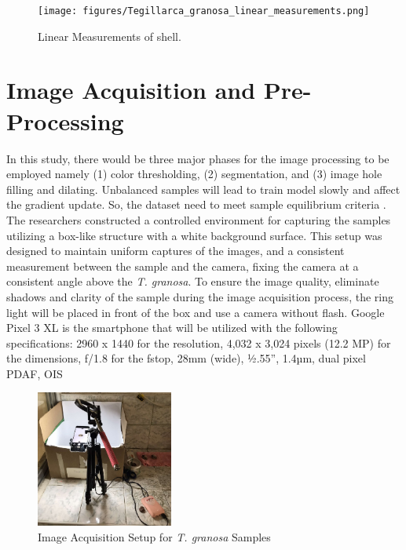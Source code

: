 \begin{figure}[!htbp]
	\centering
	\texttt{[image: figures/Tegillarca\_granosa\_linear\_measurements.png]}
	\caption{Linear Measurements of  \Tegillarcagranosa shell.}
	\label{fig:linear_measurements}
\end{figure}

\section{Image Acquisition and Pre-Processing}
\label{sec:imageprocess}
In this study, there would be three major phases for the image processing to be employed namely (1) color thresholding, (2) segmentation, and (3) image hole filling and dilating. Unbalanced samples will lead to train model slowly and affect the gradient update. So, the dataset need to meet sample equilibrium criteria \cite{cui2020}. The researchers constructed a controlled environment for capturing the samples utilizing a box-like structure with a white background surface. This setup was designed to maintain uniform captures of the images, and a consistent measurement between the sample and the camera, fixing the camera at a consistent angle above the \textit{T. granosa}. To ensure the image quality, eliminate shadows and clarity of the sample during the image acquisition process, the ring light will be placed in front of the box and use a camera without flash. Google Pixel 3 XL is the smartphone that will be utilized with the following specifications: 2960 x 1440 for the resolution, 4,032 x 3,024 pixels (12.2 MP) for the dimensions, f/1.8 for the fstop, 28mm (wide), ½.55”, 1.4µm, dual pixel PDAF, OIS \cite{concepcion2023}

\begin{figure}[!htbp]
	\centering
	\includegraphics[width=0.4\textwidth]{figures/setup.jpg}
	\caption{Image Acquisition Setup for \textit{T. granosa} Samples}
	\label{fig: setup}
\end{figure}



